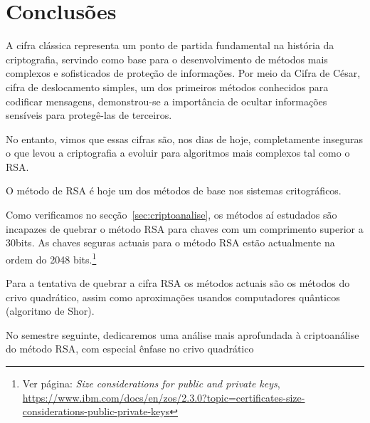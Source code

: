 \chapter{Conclusões}
\label{sec:conclusoes}


A cifra clássica representa um ponto de partida fundamental na história da criptografia, servindo como base para o desenvolvimento de métodos mais complexos e sofisticados de proteção de informações. Por meio da Cifra de César, cifra de deslocamento simples, um dos primeiros métodos conhecidos para codificar mensagens, demonstrou-se a importância de ocultar informações sensíveis para protegê-las de terceiros. 

No entanto, vimos que essas cifras são, nos dias de hoje, completamente inseguras  o que levou a criptografia a evoluir para algoritmos mais complexos tal como o RSA.


O método de RSA é hoje um dos métodos de base nos sistemas critográficos.

Como verificamos no secção~\ref{sec:criptoanalise}, os métodos aí estudados são incapazes de quebrar o método RSA para chaves com um comprimento superior a 30bits. As chaves seguras actuais para o método RSA estão actualmente na ordem do 2048 bits.\footnote{Ver página: \emph{Size considerations for public and private keys}, \url{https://www.ibm.com/docs/en/zos/2.3.0?topic=certificates-size-considerations-public-private-keys}}

Para a tentativa de quebrar a cifra RSA os métodos actuais são os métodos do crivo quadrático, assim como aproximações usandos computadores quânticos (algoritmo de Shor).

No semestre seguinte, dedicaremos uma análise mais aprofundada à criptoanálise do método RSA, com especial ênfase no crivo quadrático

